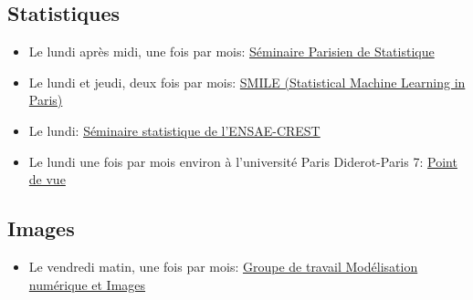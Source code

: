 \subsection{Statistiques}

\begin{itemize}
 \item Le lundi après midi, une fois par mois:
 \href{https://sites.google.com/site/semstats/}{Séminaire Parisien de Statistique}
 \item Le lundi et jeudi, deux fois par mois:  
\href{https://sites.google.com/site/smileinparis/home}{SMILE (Statistical Machine Learning in Paris)}
 \item Le lundi: 
\href{http://certis.enpc.fr/~dalalyan/seminar.html}{Séminaire statistique de l'ENSAE-CREST}
 \item Le lundi une fois par mois environ \`a l'universit\'e Paris Diderot-Paris 7:  
\href{http://dominiquepicard.blogspot.fr/p/seminaire-point-de-vue.html}{Point de vue}
\end{itemize}



\subsection{Images}
\begin{itemize}
 
 \item Le vendredi matin, une fois par mois:
 \href{http://w3.mi.parisdescartes.fr/map5/-Groupe-de-travail-Modelisation-}
{Groupe de travail Modélisation numérique et Images
}
\end{itemize}
